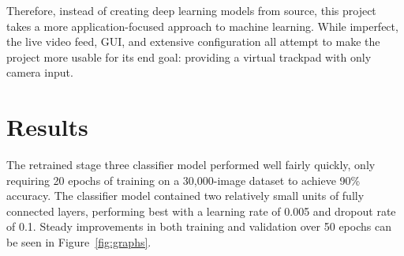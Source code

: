 \documentclass{article}
\begin{document}
Therefore, instead of creating deep learning models from source, this project takes a more application-focused approach to machine learning. While imperfect, the live video feed, GUI, and extensive configuration all attempt to make the project more usable for its end goal: providing a virtual trackpad with only camera input.


\section{Results}
The retrained stage three classifier model performed well fairly quickly, only requiring 20 epochs of training on a 30,000-image dataset \cite{Alexander_2024} to achieve 90\% accuracy. The classifier model contained two relatively small units of fully connected layers, performing best with a learning rate of 0.005 and dropout rate of 0.1. Steady improvements in both training and validation over 50 epochs can be seen in Figure~\ref{fig:graphs}.
\end{document}

